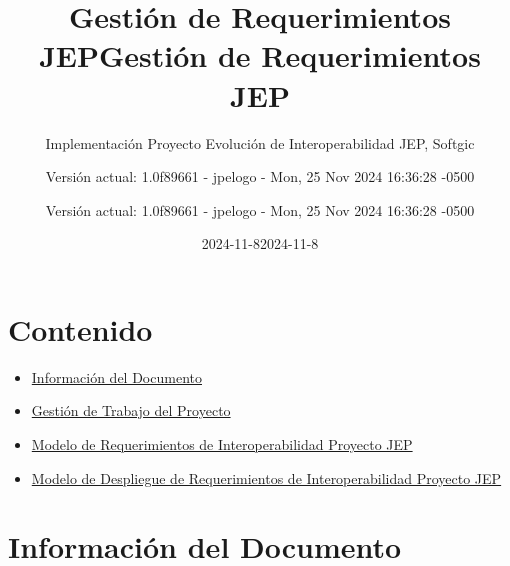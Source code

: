 \documentclass[
  paper=a4,
  ,captions=tableheading
]{scrartcl}
\title{Gestión de Requerimientos JEP}
\subtitle{Implementación Proyecto Evolución de Interoperabilidad JEP,
Softgic}
\author{Versión actual: 1.0f89661 - jpelogo - Mon, 25 Nov 2024 16:36:28
-0500}
\date{2024-11-8}
\title{Gestión de Requerimientos JEP}
\author{Versión actual: 1.0f89661 - jpelogo - Mon, 25 Nov 2024 16:36:28
-0500}
\date{2024-11-8}
\providecommand{\tightlist}{%
  \setlength{\itemsep}{0pt}\setlength{\parskip}{0pt}}
\begin{document}
\begin{titlepage}
\newcommand{\colorRule}[3][black]{\textcolor[HTML]{#1}{\rule{#2}{#3}}}
\end{titlepage}
\restoregeometry
{}




\section{Contenido}\label{sec:contenido}

\begin{itemize}
\tightlist
\item
  \hyperref[informaciuxf3n-del-documento]{Información del Documento}
\item
  \hyperref[gestiuxf3n-de-trabajo-del-proyecto]{Gestión de Trabajo del
  Proyecto}
\item
  \hyperref[modelo-de-requerimientos-de-interoperabilidad-proyecto-jep]{Modelo
  de Requerimientos de Interoperabilidad Proyecto JEP}
\item
  \hyperref[modelo-de-despliegue-de-requerimientos-de-interoperabilidad-proyecto-jep]{Modelo
  de Despliegue de Requerimientos de Interoperabilidad Proyecto JEP}
\end{itemize}

\newpage

\section{Información del
Documento}\label{sec:informaciuxf3n-del-documento}
\end{document}
